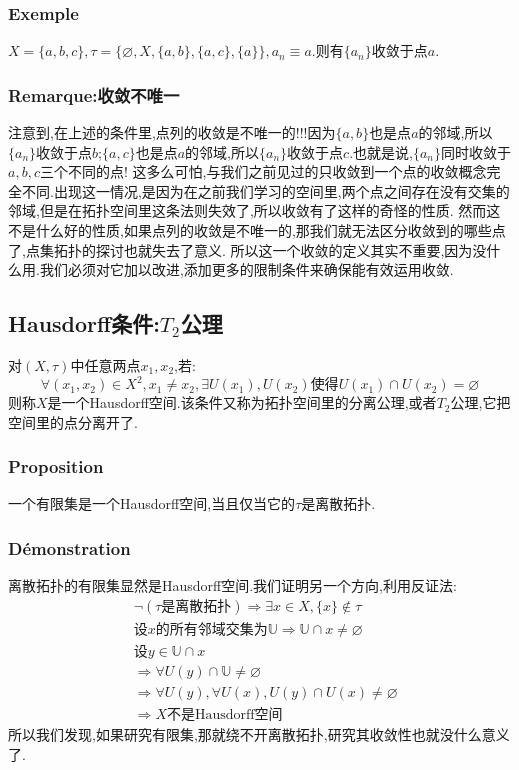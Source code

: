 \documentclass[12pt, a4paper, oneside]{ctexbook}
\begin{document}
  \subsubsection{Exemple}
  $X=\{a,b,c\},\tau =\{\varnothing, X, \{a,b\}, \{a,c\}, \{a\}\},a_n\equiv a$.则有$\{a_n\}$收敛于点$a$.
  \subsubsection{Remarque:收敛不唯一}
  注意到,在上述的条件里,点列的收敛是不唯一的!!!因为$\{a,b\}$也是点$a$的邻域,所以$\{a_n\}$收敛于点$b$;$\{a,c\}$也是点$a$的邻域,所以$\{a_n\}$收敛于点$c$.也就是说,$\{a_n\}$同时收敛于$a,b,c$三个不同的点!
  这多么可怕,与我们之前见过的只收敛到一个点的收敛概念完全不同.出现这一情况,是因为在之前我们学习的空间里,两个点之间存在没有交集的邻域,但是在拓扑空间里这条法则失效了,所以收敛有了这样的奇怪的性质.
  然而这不是什么好的性质,如果点列的收敛是不唯一的,那我们就无法区分收敛到的哪些点了,点集拓扑的探讨也就失去了意义.
  所以这一个收敛的定义其实不重要,因为没什么用.我们必须对它加以改进,添加更多的限制条件来确保能有效运用收敛.
  \subsection{Hausdorff条件:$T_2$公理}
  对$(X,\tau)$中任意两点$x_1,x_2$,若:
  $$
    \forall(x_1,x_2)\in X^2, x_1\neq x_2, \exists U(x_1),U(x_2)\text{使得}U(x_1)\cap U(x_2)=\varnothing
  $$
  则称$X$是一个Hausdorff空间.该条件又称为拓扑空间里的分离公理,或者$T_2$公理,它把空间里的点分离开了.
  \subsubsection{Proposition}
  一个有限集是一个Hausdorff空间,当且仅当它的$\tau$是离散拓扑.
  \subsubsection{Démonstration}
  离散拓扑的有限集显然是Hausdorff空间.我们证明另一个方向,利用反证法:
  $$
  \begin{aligned}&
    \lnot (\tau\text{是离散拓扑})\Rightarrow \exists x\in X, \{x\}\notin \tau\\&
    \text{设}x \text{的所有邻域交集为}\mathbb{U}\Rightarrow\mathbb{U}\cap x\neq\varnothing \\&
    \text{设}y\in\mathbb{U}\cap x\\&
    \Rightarrow \forall U(y)\cap\mathbb{U}\neq\varnothing\\&
    \Rightarrow \forall U(y),\forall U(x),U(y)\cap U(x)\neq\varnothing\\&
    \Rightarrow X\text{不是Hausdorff空间}
    \end{aligned}
  $$
  所以我们发现,如果研究有限集,那就绕不开离散拓扑,研究其收敛性也就没什么意义了.
\end{document}
